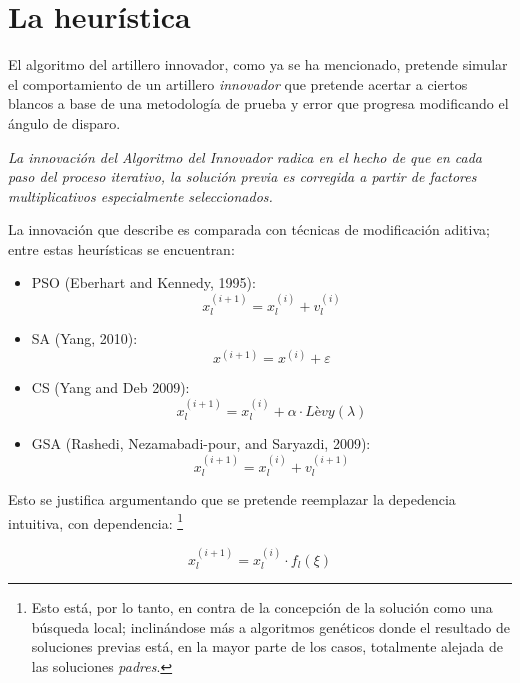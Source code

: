 \documentclass[a4paper]{report}
\begin{document}
\section{La heur\'istica}
El algoritmo del artillero innovador, como ya se ha mencionado, pretende simular el
comportamiento de un artillero \textit{innovador} que pretende acertar a ciertos
blancos a base de una metodolog\'ia de prueba y error que progresa modificando el
\'angulo de disparo.

\begin{center}
  \textit{La innovaci\'on del Algoritmo del Innovador radica en el hecho de que
    en cada paso del proceso iterativo, la soluci\'on previa es corregida a partir
  de factores multiplicativos especialmente seleccionados.}~\cite{aig}
\end{center}

La innovaci\'on que describe es comparada con t\'ecnicas de modificaci\'on aditiva;
entre estas heur\'isticas se encuentran:

\begin{itemize}
\item PSO (Eberhart and Kennedy, 1995):
  \[x_l^{(i+1)} = x_l^{(i)} + v_l^{(i)}\]
\item SA (Yang, 2010):
  \[x^{(i+1)} = x^{(i)} + \varepsilon\]
\item CS (Yang and Deb 2009):
  \[x_l^{(i+1)} = x_l^{(i)} + \alpha \cdot \textit{L\`evy} (\lambda)\]
\item GSA (Rashedi, Nezamabadi-pour, and Saryazdi, 2009):
  \[x_l^{(i+1)} = x_l^{(i)} + v_l^{(i+1)}\]
\end{itemize}

Esto se justifica argumentando que se pretende reemplazar la depedencia intuitiva,
con dependencia:
\footnote{Esto est\'a, por lo tanto, en contra de la concepci\'on de la soluci\'on
  como una b\'usqueda local; inclin\'andose m\'as a algoritmos gen\'eticos donde
  el resultado de soluciones previas est\'a, en la mayor parte de los casos,
totalmente alejada de las soluciones \textit{padres}.}

\[x_l^{(i+1)} = x_l^{(i)} \cdot f_l(\xi)\]
\end{document}
